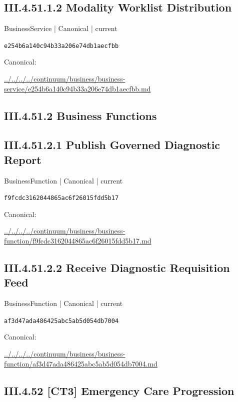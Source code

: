 \documentclass[10pt,a4paper]{article}
\begin{document}
\subsection*{III.4.51.1.2 Modality Worklist Distribution}
{\small BusinessService | Canonical | current}\par
\texttt{e254b6a140c94b33a206e74db1aecfbb}\par
Canonical: \par
{\footnotesize\url{../../../../continuum/business/business-service/e254b6a140c94b33a206e74db1aecfbb.md}}\par
\subsection*{III.4.51.2 Business Functions}
\subsection*{III.4.51.2.1 Publish Governed Diagnostic Report}
{\small BusinessFunction | Canonical | current}\par
\texttt{f9fcdc3162044865ac6f26015fdd5b17}\par
Canonical: \par
{\footnotesize\url{../../../../continuum/business/business-function/f9fcdc3162044865ac6f26015fdd5b17.md}}\par
\subsection*{III.4.51.2.2 Receive Diagnostic Requisition Feed}
{\small BusinessFunction | Canonical | current}\par
\texttt{af3d47ada486425abc5ab5d054db7004}\par
Canonical: \par
{\footnotesize\url{../../../../continuum/business/business-function/af3d47ada486425abc5ab5d054db7004.md}}\par
\subsection*{III.4.52 [CT3] Emergency Care Progression}
\end{document}
